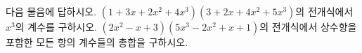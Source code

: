 다음 물음에 답하시오.
 $(1+3x+2x^2+4x^3)(3+2x+4x^2+5x^3)$의 전개식에서 $x^3$의 계수를 구하시오.
 $(2x^2-x+3)(5x^3-2x^2+x+1)$의 전개식에서 상수항을 포함한 모든 항의 계수들의 총합을 구하시오.
